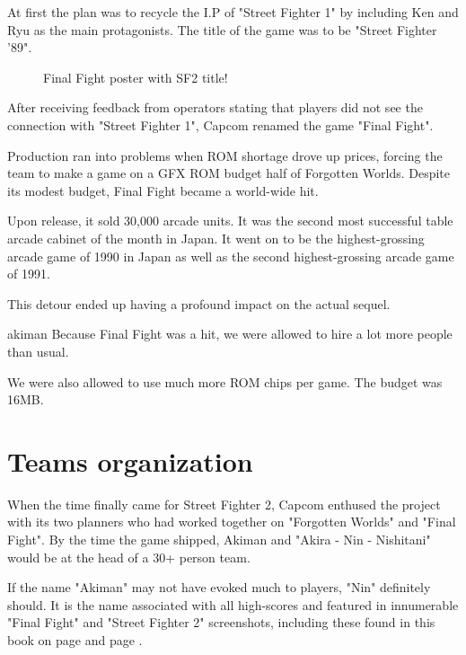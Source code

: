 At first the plan was to recycle the I.P of "Street Fighter 1" by including Ken and Ryu as the main protagonists. The title of the game was to be "Street Fighter '89".

\begin{figure}[H]
\caption*{Final Fight poster with SF2 title!}
\end{figure}

After receiving feedback from operators stating that players did not see the connection with "Street Fighter 1", Capcom renamed the game "Final Fight".

Production ran into problems when ROM shortage drove up prices, forcing the team to make a game on a GFX ROM budget half of Forgotten Worlds. Despite its modest budget, Final Fight became a world-wide hit.

Upon release, it sold 30,000 arcade units. It was the second most successful table arcade cabinet of the month in Japan. It went on to be the highest-grossing arcade game of 1990 in Japan as well as the second highest-grossing arcade game of 1991. 

This detour ended up having a profound impact on the actual sequel. 

\begin{q}{akiman\cite{gameMaestro4}}
  Because Final Fight was a hit, we were allowed to hire a lot more people than usual. 

  We were also allowed to use much more ROM chips per game. The budget was 16MB.
\end{q}






\section{Teams organization}
When the time finally came for Street Fighter 2, Capcom enthused the project with its two planners who had worked together on "Forgotten Worlds" and "Final Fight". By the time the game shipped, Akiman and "Akira - Nin - Nishitani" would be at the head of a 30+ person team.

\begin{trivia}
If the name "Akiman" may not have evoked much to players, "Nin" definitely should. It is the name associated with all high-scores and featured in innumerable "Final Fight" and "Street Fighter 2" screenshots, including these found in this book on page \pageref{nin_ff} and page \pageref{nin_sf2}.  
\end{trivia}

